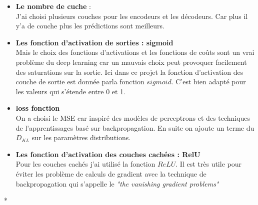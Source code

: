 \documentclass[12pt,a4paper]{report}
\begin{document}
\begin{itemize}[label=\textbullet, font=\LARGE \color{blue}]
\item  \textbf{Le nombre de cuche  } : \\
J'ai choisi plusieurs couches pour les  encodeurs et les décodeurs. Car plus il y'a de couche plus les prédictions sont meilleurs. 

\item  \textbf{Les  fonction d'activation de sorties : sigmoid} \\
Mais le choix des fonctions d'activations et les fonctions de coûts sont un vrai problème du deep learning car un mauvais choix peut provoquer facilement des saturations sur la sortie. 
Ici dans ce projet la fonction d'activation des couche de sortie est donnée parla fonction  $sigmoid$. C'est bien adapté  pour les valeurs qui s’étende entre 0 et 1.
\item \textbf{loss fonction }\\
On a choisi le MSE car inspiré des modèles de perceptrons et des techniques de  l'apprentissages basé sur backpropagation. En suite on ajoute un terme du $ D_{KL} $ sur les paramètres distributions.
\item   \textbf{Les  fonction d'activation des couches cachées  : RelU}\\
Pour les couches cachés j'ai utilisé la fonction $ReLU$. Il est très utile pour éviter les problème  de  calculs de gradient avec la technique de backpropagation qui s'appelle le  \textit{"the vanishing gradient problems"}  

 
\end{itemize}*

\newpage
\end{document}
